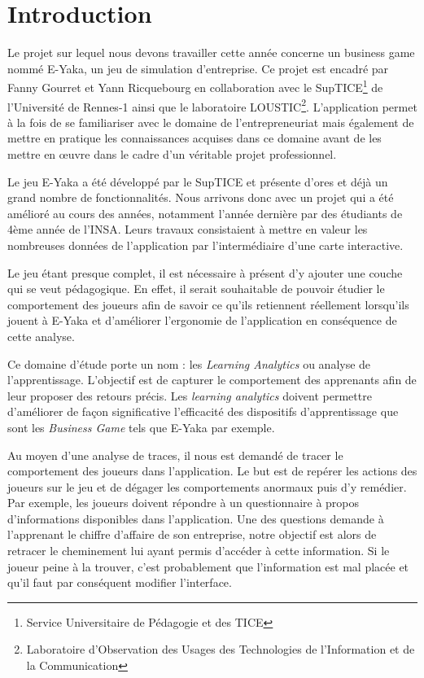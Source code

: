 \chapter*{Introduction}

	Le projet sur lequel nous devons travailler cette année concerne un business game nommé E-Yaka, un jeu de simulation d’entreprise. Ce projet est encadré par Fanny Gourret et Yann Ricquebourg en collaboration avec le SupTICE\footnote{Service Universitaire de Pédagogie et des TICE} de l’Université de Rennes-1 ainsi que le laboratoire LOUSTIC\footnote{Laboratoire d'Observation des Usages des Technologies de l'Information et de la Communication}. L’application permet à la fois de se familiariser avec le domaine de l'entrepreneuriat mais également de mettre en pratique les connaissances acquises dans ce domaine avant de les mettre en œuvre dans le cadre d’un véritable projet professionnel.

	Le jeu E-Yaka a été développé par le SupTICE et présente d’ores et déjà un grand nombre de fonctionnalités. Nous arrivons donc avec un projet qui a été amélioré au cours des années, notamment l’année dernière par des étudiants de 4ème année de l’INSA. Leurs travaux consistaient à mettre en valeur les nombreuses données de l’application par l'intermédiaire d’une carte interactive.

	Le jeu étant presque complet, il est nécessaire à présent d’y ajouter une couche qui se veut pédagogique. En effet, il serait souhaitable de pouvoir étudier le comportement des joueurs afin de savoir ce qu’ils retiennent réellement lorsqu’ils jouent à E-Yaka et d’améliorer l’ergonomie de l’application en conséquence de cette analyse.

	Ce domaine d’étude porte un nom : les \emph{Learning Analytics} ou analyse de l’apprentissage. L’objectif est de capturer le comportement des apprenants afin de leur proposer des retours précis. Les \emph{learning analytics} doivent permettre d’améliorer de façon significative l’efficacité des dispositifs d’apprentissage que sont les \emph{Business Game} tels que E-Yaka par exemple.

	Au moyen d’une analyse de traces, il nous est demandé de tracer le comportement des joueurs dans l’application. Le but est de repérer les actions des joueurs sur le jeu et de dégager les comportements anormaux puis d’y remédier. 
Par exemple, les joueurs doivent répondre à un questionnaire à propos d’informations disponibles dans l’application. Une des questions demande à l'apprenant le chiffre d’affaire de son entreprise, notre objectif est alors de retracer le cheminement lui ayant permis d’accéder à cette information. Si le joueur peine à la trouver, c’est probablement que l’information est mal placée et qu’il faut par conséquent modifier l’interface. 

